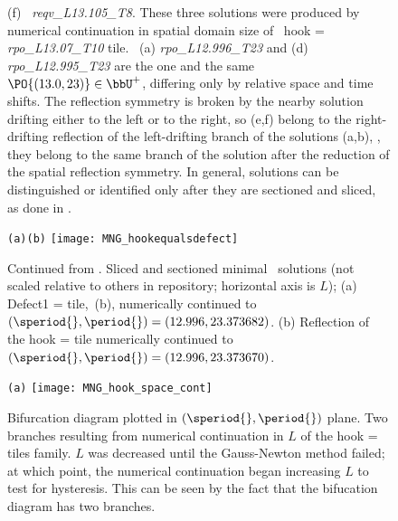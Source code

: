 \begin{figure}
{(f) \reqv\ \emph{reqv\_L13.105\_T8}.
These three solutions were produced by numerical continuation in spatial
domain size of \twot\ hook = \emph{rpo\_L13.07\_T10} tile.
\twoTs\
(a) \emph{rpo\_L12.996\_T23} and
(d) \emph{rpo\_L12.995\_T23}
are the one and the same $\PO{(13.0,23)}\in\bbU^+$, differing only by
relative space and time shifts. The reflection symmetry is broken by the
nearby solution drifting either to the left or to the right, so (e,f)
belong to the right-drifting reflection of the left-drifting branch of
the solutions (a,b), \ie, they belong to the same branch of the
solution after the reduction of the spatial reflection symmetry.
In general, solutions can be distinguished or identified only after they
are sectioned and sliced, as done in \reffig{fig:MNG_hookequalsdefect}.
}
\end{figure}

\begin{figure}
\begin{minipage}[height=.32\textheight]{.8\textwidth}
\centering \small{\texttt{(a)}\qquad\qquad\texttt{(b)}}
\texttt{[image: MNG\_hookequalsdefect]}
\end{minipage}
\caption{ \label{fig:MNG_hookequalsdefect}
Continued from .
Sliced and sectioned minimal \twot\ solutions (not scaled relative to
others in repository; horizontal axis is $L$);
(a) Defect1 =  %
tile,
\,(b), numerically continued to
$(\speriod{},\period{})=(12.996,23.373682)$.
(b) Reflection of the hook  =  %
tile numerically
continued to $(\speriod{},\period{}) = (12.996,23.373670)$.
}
\end{figure}

\begin{figure}
\begin{minipage}[height=.20\textheight]{.8\textwidth}
\centering \small{\texttt{(a)}}
\texttt{[image: MNG\_hook\_space\_cont]}
\end{minipage}
\caption{ \label{fig:MNG_hook_spatial_cont}
Bifurcation diagram plotted in $(\speriod{},\period{})$ plane.
Two branches resulting from numerical continuation in $L$ of
the hook  =  %
tiles family. $L$ was decreased until the
Gauss-Newton method failed; at which point, the numerical continuation
began increasing $L$ to test for hysteresis. This can be seen by the fact
that the bifucation diagram has two branches.
}
\end{figure}

